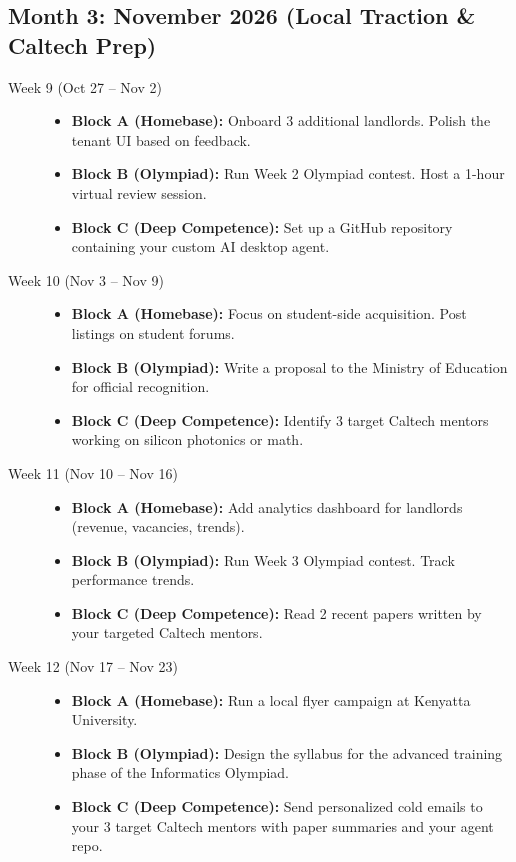 \documentclass[11pt,a4paper]{article}
\begin{document}
\subsection{Month 3: November 2026 (Local Traction \& Caltech Prep)}
\begin{description}
    \item[Week 9 (Oct 27 -- Nov 2)] \hfill
    \begin{itemize}
        \item \textbf{Block A (Homebase):} Onboard 3 additional landlords. Polish the tenant UI based on feedback.
        \item \textbf{Block B (Olympiad):} Run Week 2 Olympiad contest. Host a 1-hour virtual review session.
        \item \textbf{Block C (Deep Competence):} Set up a GitHub repository containing your custom AI desktop agent.
    \end{itemize}
    
    \item[Week 10 (Nov 3 -- Nov 9)] \hfill
    \begin{itemize}
        \item \textbf{Block A (Homebase):} Focus on student-side acquisition. Post listings on student forums.
        \item \textbf{Block B (Olympiad):} Write a proposal to the Ministry of Education for official recognition.
        \item \textbf{Block C (Deep Competence):} Identify 3 target Caltech mentors working on silicon photonics or math.
    \end{itemize}
    
    \item[Week 11 (Nov 10 -- Nov 16)] \hfill
    \begin{itemize}
        \item \textbf{Block A (Homebase):} Add analytics dashboard for landlords (revenue, vacancies, trends).
        \item \textbf{Block B (Olympiad):} Run Week 3 Olympiad contest. Track performance trends.
        \item \textbf{Block C (Deep Competence):} Read 2 recent papers written by your targeted Caltech mentors.
    \end{itemize}
    
    \item[Week 12 (Nov 17 -- Nov 23)] \hfill
    \begin{itemize}
        \item \textbf{Block A (Homebase):} Run a local flyer campaign at Kenyatta University.
        \item \textbf{Block B (Olympiad):} Design the syllabus for the advanced training phase of the Informatics Olympiad.
        \item \textbf{Block C (Deep Competence):} Send personalized cold emails to your 3 target Caltech mentors with paper summaries and your agent repo.
    \end{itemize}
\end{description}
\end{document}
